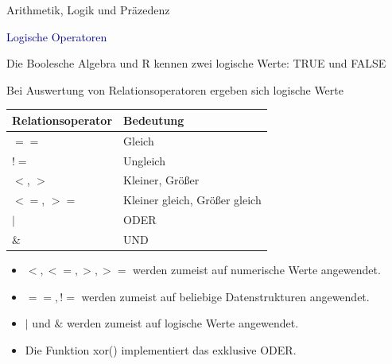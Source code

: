 \documentclass[
  8pt,
  ignorenonframetext,
]{beamer}
\providecommand{\tightlist}{%
  \setlength{\itemsep}{0pt}\setlength{\parskip}{0pt}}
\begin{document}
\begin{frame}{Arithmetik, Logik und Präzedenz}
\protect\hypertarget{arithmetik-logik-und-pruxe4zedenz-2}{}

\textcolor{darkblue}{Logische Operatoren} \small

Die Boolesche Algebra und R kennen zwei logische Werte: TRUE und FALSE

Bei Auswertung von Relationsoperatoren ergeben sich logische Werte

\small
\begin{center}
\begin{tabular}{l|l}
Relationsoperator   & Bedeutung                             \\\hline
$==$                & Gleich                                \\
$!=$                & Ungleich                              \\
$<$, $>$            & Kleiner, Größer                       \\
$<=$, $>=$          & Kleiner gleich, Größer gleich         \\
$\vert$             & ODER                                  \\
$\&$                & UND                                   \\
\end{tabular}
\end{center}

\begin{itemize}
\tightlist
\item
  \(<,<=,>,>=\) werden zumeist auf numerische Werte angewendet.
\item
  \(==,!=\) werden zumeist auf beliebige Datenstrukturen angewendet.
\item
  \(\vert\) und \(\&\) werden zumeist auf logische Werte angewendet.
\item
  Die Funktion xor() implementiert das exklusive ODER.
\end{itemize}
\end{frame}
\end{document}
